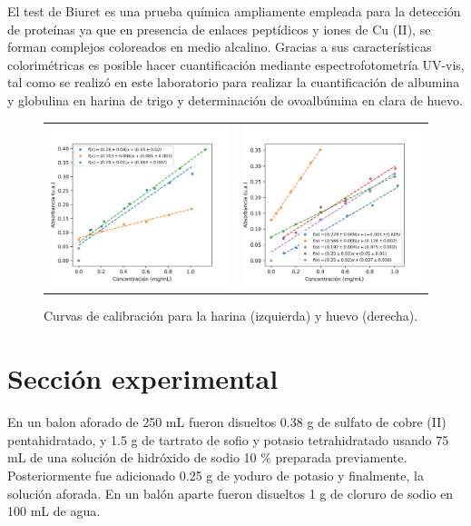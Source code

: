 \documentclass[fleqn,10pt]{SelfArx}
\begin{document}
\newpage

El test de Biuret es una prueba química ampliamente empleada para la detección de proteínas ya que en presencia de enlaces peptídicos y iones de Cu (II), se forman complejos coloreados en medio alcalino. Gracias a sus características colorimétricas es posible hacer cuantificación mediante espectrofotometría UV-vis, tal como se realizó en este laboratorio para realizar la cuantificación de albumina y globulina en harina de trigo y determinación de ovoalbúmina en clara de huevo. 

\begin{figure}[h]
	\centering
	\begin{tabular}{cc}
		\includegraphics[width = 0.45\linewidth]{harinas_reg} & 
		\includegraphics[width = 0.45\linewidth]{huevos_reg}
	\end{tabular}
	\caption{Curvas de calibraci\'on para la harina (izquierda) y huevo (derecha).}
	\label{fig: pendientes}
\end{figure}
	
\section{Secci\'on experimental}
En un balon aforado de 250 mL fueron disueltos 0.38 g de sulfato de cobre (II) pentahidratado, y 1.5 g de tartrato de sofio y potasio tetrahidratado usando 75 mL de una soluci\'on de hidr\'oxido de sodio 10 \% preparada previamente. Posteriormente fue adicionado 0.25 g de yoduro de potasio y finalmente, la soluci\'on aforada. En un balón aparte fueron disueltos 1 g de cloruro de sodio en 100 mL de agua.
\end{document}
